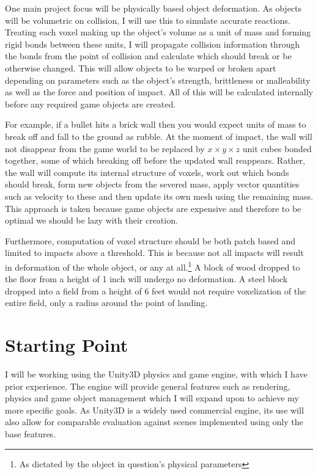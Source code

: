 One main project focus will be physically based object deformation. As objects will be volumetric on collision, I will use this to simulate accurate reactions. Treating each voxel making up the object's volume as a unit of mass and forming rigid bonds between these units, I will propagate collision information through the bonds from the point of collision and calculate which should break or be otherwise changed. This will allow objects to be warped or broken apart depending on parameters such as the object's strength, brittleness or malleability as well as the force and position of impact. All of this will be calculated internally before any required game objects are created.

For example, if a bullet hits a brick wall then you would expect units of mass to break off and fall to the ground as rubble. At the moment of impact, the wall will not disappear from the game world to be replaced by $x\times y\times z$ unit cubes bonded together, some of which breaking off before the updated wall reappears. Rather, the wall will compute its internal structure of voxels, work out which bonds should break, form new objects from the severed mass, apply vector quantities such as velocity to these and then update its own mesh using the remaining mass. This approach is taken because game objects are expensive and therefore to be optimal we should be lazy with their creation.

Furthermore, computation of voxel structure should be both patch based and limited to impacts above a threshold. This is because not all impacts will result in deformation of the whole object, or any at all.\footnote{As dictated by the object in question's physical parameters} A block of wood dropped to the floor from a height of 1 inch will undergo no deformation. A steel block dropped into a field from a height of 6 feet would not require voxelization of the entire field, only a radius around the point of landing.


\section*{Starting Point}

I will be working using the Unity3D physics and game engine, with which I have prior experience. The engine will provide general features such as rendering, physics and game object management which I will expand upon to achieve my more specific goals. As Unity3D is a widely used commercial engine, its use will also allow for comparable evaluation against scenes implemented using only the base features.


